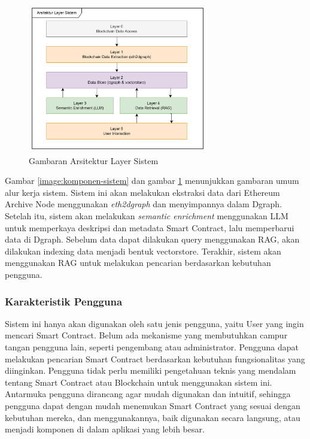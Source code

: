 \begin{figure}[ht]
	\centering
	\includegraphics[width=0.7\textwidth]{resources/chapter-3/layer-arsitektur.png}
	\caption{Gambaran Arsitektur Layer Sistem}
	\label{image:layer-arsitektur}
\end{figure}


Gambar \ref{image:komponen-sistem} dan gambar \ref{image:layer-arsitektur} menunjukkan gambaran umum alur kerja sistem. Sistem ini akan melakukan ekstraksi data dari Ethereum Archive Node menggunakan \textit{eth2dgraph} dan menyimpannya dalam Dgraph. Setelah itu, sistem akan melakukan \textit{semantic enrichment} menggunakan LLM untuk memperkaya deskripsi dan metadata Smart Contract, lalu memperbarui data di Dgraph. Sebelum data dapat dilakukan query menggunakan RAG, akan dilakukan indexing data menjadi bentuk vectorstore. Terakhir, sistem akan menggunakan RAG untuk melakukan pencarian berdasarkan kebutuhan pengguna. 



\subsubsection{Karakteristik Pengguna}

Sistem ini hanya akan digunakan oleh satu jenis pengguna, yaitu User yang ingin mencari Smart Contract. Belum ada mekanisme yang membutuhkan campur tangan pengguna lain, seperti pengembang atau administrator. Pengguna dapat melakukan pencarian Smart Contract berdasarkan kebutuhan fungsionalitas yang diinginkan. Pengguna tidak perlu memiliki pengetahuan teknis yang mendalam tentang Smart Contract atau Blockchain untuk menggunakan sistem ini. Antarmuka pengguna dirancang agar mudah digunakan dan intuitif, sehingga pengguna dapat dengan mudah menemukan Smart Contract yang sesuai dengan kebutuhan mereka, dan menggunakannya, baik digunakan secara langsung, atau menjadi komponen di dalam aplikasi yang lebih besar.

